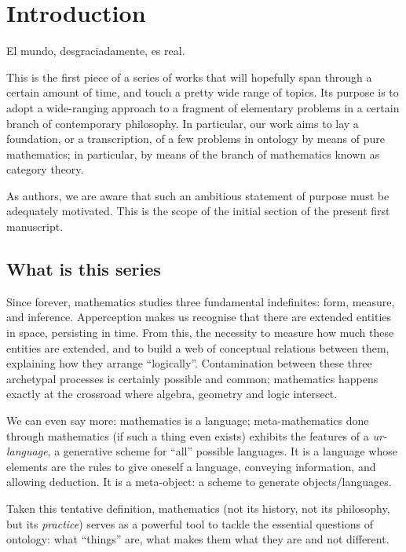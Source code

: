 \section{Introduction}\label{sec_intro}
\epigraph{El mundo, desgraciadamente, es real.}{\cite{confutacion}}
This is the first piece of a series of works that will hopefully span through a certain amount of time, and touch a pretty wide range of topics. Its purpose is to adopt a wide-ranging approach to a fragment of elementary problems in a certain branch of contemporary philosophy. In particular, our work aims to lay a foundation, or a transcription, of a few problems in ontology by means of pure mathematics; in particular, by means of the branch of mathematics known as category theory.

As authors, we are aware that such an ambitious statement of purpose must be adequately motivated. This is the scope of the initial section of the present first manuscript.
\subsection{What is this series}

Since forever, mathematics studies three fundamental indefinites: form, measure, and inference. Apperception makes us recognise that there are extended entities in space, persisting in time. From this, the necessity to measure how much these entities are extended, and to build a web of conceptual relations between them, explaining how they arrange ``logically''.
Contamination between these three archetypal processes is certainly possible and common; mathematics happens exactly at the crossroad where algebra, geometry and logic intersect.

We can even say more: mathematics is a language; meta-mathematics done through mathematics (if such a thing even exists) exhibits the features of a \emph{ur-language}, a generative scheme for ``all'' possible languages. It is a language whose elements are the rules to give oneself a language, conveying information, and allowing deduction. It is a meta-object: a scheme to generate objects/languages.

Taken this tentative definition, mathematics (not its history, not its philosophy, but its \emph{practice}) serves as a powerful tool to tackle the essential questions of ontology: what ``things'' are, what makes them what they are and not different.

